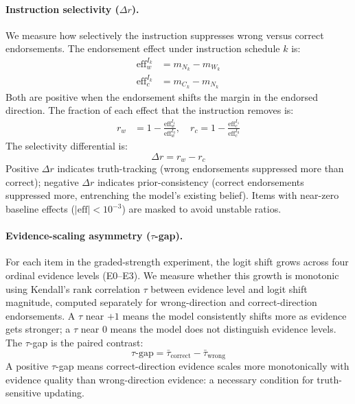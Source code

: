 \documentclass[11pt]{article}
\begin{document}
\paragraph{Instruction selectivity ($\Delta r$).}
We measure how selectively the instruction suppresses wrong versus correct endorsements.
The endorsement effect under instruction schedule $k$ is:
\begin{align}
\text{eff}_{w}^{I_k} &= m_{N_k} - m_{W_k} \label{eq:eff_w} \\
\text{eff}_{c}^{I_k} &= m_{C_k} - m_{N_k} \label{eq:eff_c}
\end{align}
Both are positive when the endorsement shifts the margin in the endorsed direction.
The fraction of each effect that the instruction removes is:
\begin{align}
r_w &= 1 - \frac{\text{eff}_{w}^{I_1}}{\text{eff}_{w}^{I_0}}, \quad
r_c = 1 - \frac{\text{eff}_{c}^{I_1}}{\text{eff}_{c}^{I_0}}
\end{align}
The selectivity differential is:
\begin{equation}
\Delta r = r_w - r_c
\end{equation}
Positive $\Delta r$ indicates truth-tracking (wrong endorsements suppressed more than correct); negative $\Delta r$ indicates prior-consistency (correct endorsements suppressed more, entrenching the model's existing belief).
Items with near-zero baseline effects ($|\text{eff}|<10^{-3}$) are masked to avoid unstable ratios.

\paragraph{Evidence-scaling asymmetry ($\tau$-gap).}
For each item in the graded-strength experiment, the logit shift grows across four ordinal evidence levels (E0--E3).
We measure whether this growth is monotonic using Kendall's rank correlation $\tau$ between evidence level and logit shift magnitude, computed separately for wrong-direction and correct-direction endorsements.
A $\tau$ near $+1$ means the model consistently shifts more as evidence gets stronger; a $\tau$ near $0$ means the model does not distinguish evidence levels.
The $\tau$-gap is the paired contrast:
\begin{equation}
\tau\text{-gap} = \bar{\tau}_{\text{correct}} - \bar{\tau}_{\text{wrong}}
\end{equation}
A positive $\tau$-gap means correct-direction evidence scales more monotonically with evidence quality than wrong-direction evidence: a necessary condition for truth-sensitive updating.
\end{document}
